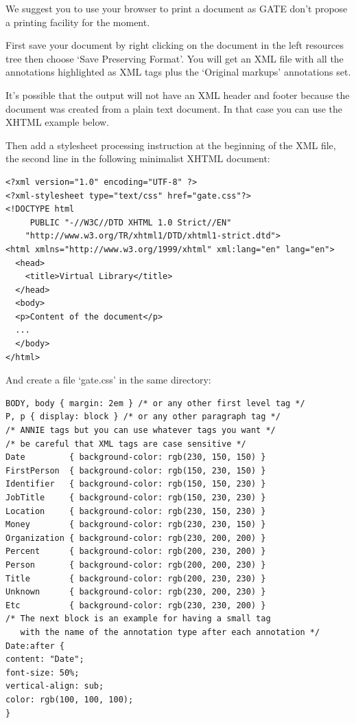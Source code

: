 
We suggest you to use your browser to print a document as GATE don't
propose a printing facility for the moment.

First save your document by right clicking on the document in the left
resources tree then choose `Save Preserving Format'. You will get an XML
file with all the annotations highlighted as XML tags plus the `Original
markups' annotations set.

It's possible that the output will not have an XML header and footer because
the document was created from a plain text document. In that case you can
use the XHTML example below.

Then add a stylesheet processing instruction at the beginning of the XML
file, the second line in the following minimalist XHTML document:

\begin{small}\begin{verbatim}
<?xml version="1.0" encoding="UTF-8" ?>
<?xml-stylesheet type="text/css" href="gate.css"?>
<!DOCTYPE html
     PUBLIC "-//W3C//DTD XHTML 1.0 Strict//EN"
    "http://www.w3.org/TR/xhtml1/DTD/xhtml1-strict.dtd">
<html xmlns="http://www.w3.org/1999/xhtml" xml:lang="en" lang="en">
  <head>
    <title>Virtual Library</title>
  </head>
  <body>
  <p>Content of the document</p>
  ...
  </body>
</html>
\end{verbatim}\end{small}

And create a file `gate.css' in the same directory:
\begin{small}\begin{verbatim}
BODY, body { margin: 2em } /* or any other first level tag */
P, p { display: block } /* or any other paragraph tag */
/* ANNIE tags but you can use whatever tags you want */
/* be careful that XML tags are case sensitive */
Date         { background-color: rgb(230, 150, 150) }
FirstPerson  { background-color: rgb(150, 230, 150) }
Identifier   { background-color: rgb(150, 150, 230) }
JobTitle     { background-color: rgb(150, 230, 230) }
Location     { background-color: rgb(230, 150, 230) }
Money        { background-color: rgb(230, 230, 150) }
Organization { background-color: rgb(230, 200, 200) }
Percent      { background-color: rgb(200, 230, 200) }
Person       { background-color: rgb(200, 200, 230) }
Title        { background-color: rgb(200, 230, 230) }
Unknown      { background-color: rgb(230, 200, 230) }
Etc          { background-color: rgb(230, 230, 200) }
/* The next block is an example for having a small tag
   with the name of the annotation type after each annotation */
Date:after {
content: "Date";
font-size: 50%;
vertical-align: sub;
color: rgb(100, 100, 100);
}
\end{verbatim}\end{small}

